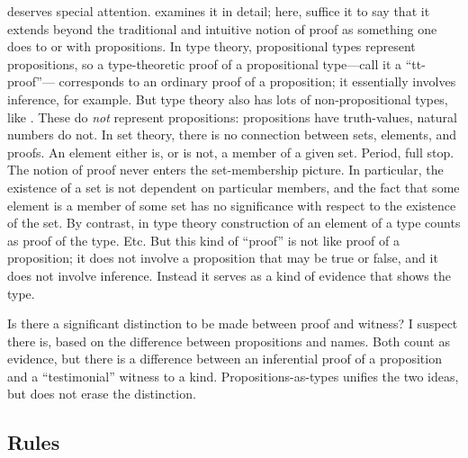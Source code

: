  deserves special
attention.   examines it in detail; here, suffice it
to say that it extends beyond the traditional and intuitive notion of
proof as something one does to or with propositions.  In type theory,
propositional types represent propositions, so a type-theoretic proof
of a propositional type---call it a ``tt-proof''--- corresponds to an
ordinary proof of a proposition; it essentially involves inference,
for example.  But type theory also has lots of non-propositional
types, like \N.  These do \textit{not} represent propositions:
propositions have truth-values, natural numbers do not.  In set
theory, there is no connection between sets, elements, and proofs.  An
element either is, or is not, a member of a given set.  Period, full
stop.  The notion of proof never enters the set-membership
picture.
In particular, the existence of a set is not dependent on particular
members, and the fact that some element is a member of some set has no
significance with respect to the existence of the set.  By contrast,
in type theory construction of an element of a type counts as proof of
the type.  Etc.  But this kind of
``proof'' is not like proof of a proposition; it does not involve a
proposition that may be true or false, and it does not involve
inference.  Instead it serves as a kind of evidence that shows the
type.

\begin{remark}
  Is there a significant distinction to be made between proof and
  witness?  I suspect there is, based on the difference between
  propositions and names.  Both count as evidence, but there is a
  difference between an inferential proof of a proposition and a
  ``testimonial'' witness to a kind.  Propositions-as-types unifies
  the two ideas, but does not erase the distinction.
\end{remark}

\subsection{\HoTT Rules}
\label{subs:hottrules}

